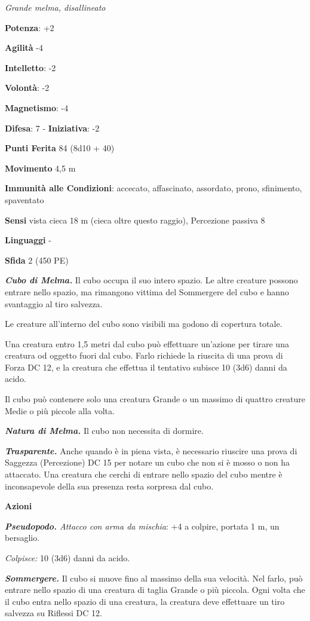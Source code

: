 \begin{multicols}{2}
\emph{Grande melma, disallineato}

\textbf{Potenza}: +2

\textbf{Agilità} -4

\textbf{Intelletto}: -2

\textbf{Volontà}: -2

\textbf{Magnetismo}: -4

\textbf{Difesa}: 7 - \textbf{Iniziativa}: -2

\textbf{Punti Ferita} 84 (8d10 + 40)

\textbf{Movimento} 4,5 m

\textbf{Immunità alle Condizioni}: accecato, affascinato, assordato,
prono, sfinimento, spaventato

\textbf{Sensi} vista cieca 18 m (cieca oltre questo raggio), Percezione
passiva 8

\textbf{Linguaggi} -

\textbf{Sfida} 2 (450 PE)\smallskip

\emph{\textbf{Cubo di Melma.}} Il cubo occupa il suo intero spazio. Le
altre creature possono entrare nello spazio, ma rimangono vittima del
Sommergere del cubo e hanno svantaggio al tiro salvezza.

Le creature all'interno del cubo sono visibili ma godono di copertura
totale.

Una creatura entro 1,5 metri dal cubo può effettuare un'azione per
tirare una creatura od oggetto fuori dal cubo. Farlo richiede la
riuscita di una prova di Forza DC 12, e la creatura che effettua il
tentativo subisce 10 (3d6) danni da acido.

Il cubo può contenere solo una creatura Grande o un massimo di quattro
creature Medie o più piccole alla volta.

\emph{\textbf{Natura di Melma.}} Il cubo non necessita di dormire.

\emph{\textbf{Trasparente.}} Anche quando è in piena vista, è necessario
riuscire una prova di Saggezza (Percezione) DC 15 per notare un cubo che
non si è mosso o non ha attaccato. Una creatura che cerchi di entrare
nello spazio del cubo mentre è inconsapevole della sua presenza resta
sorpresa dal cubo.

\smallskip\textbf{Azioni}

\emph{\textbf{Pseudopodo.} Attacco con arma da mischia}: +4 a colpire,
portata 1 m, un bersaglio.

\emph{Colpisce:} 10 (3d6) danni da acido.

\emph{\textbf{Sommergere.}} Il cubo si muove fino al massimo della sua
velocità. Nel farlo, può entrare nello spazio di una creatura di taglia
Grande o più piccola. Ogni volta che il cubo entra nello spazio di una
creatura, la creatura deve effettuare un tiro salvezza su Riflessi DC
12.


\end{multicols}
